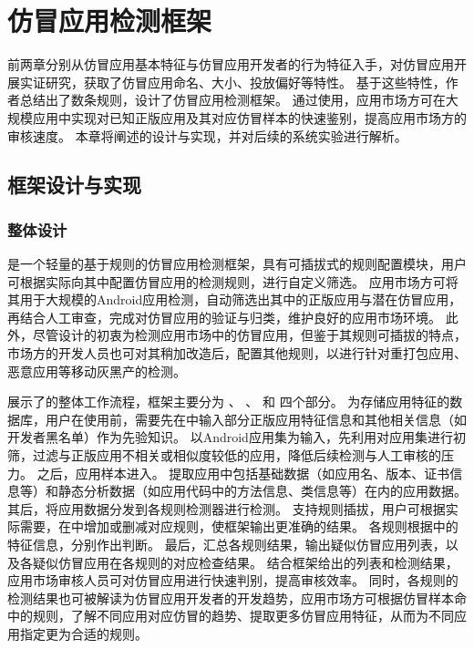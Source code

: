 \chapter{仿冒应用检测框架\mytool}
\label{chp:framework_prototype}

前两章分别从仿冒应用基本特征与仿冒应用开发者的行为特征入手，对仿冒应用开展实证研究，获取了仿冒应用命名、大小、投放偏好等特性。
基于这些特性，作者总结出了数条规则，设计了仿冒应用检测框架\mytool 。
通过使用\mytool ，应用市场方可在大规模应用中实现对已知正版应用及其对应仿冒样本的快速鉴别，提高应用市场方的审核速度。
本章将阐述\mytool 的设计与实现，并对后续的系统实验进行解析。

\section{框架设计与实现}

\subsection{整体设计}
\mytool 是一个轻量的基于规则的仿冒应用检测框架，具有可插拔式的规则配置模块，用户可根据实际向其中配置仿冒应用的检测规则，进行自定义筛选。
应用市场方可将其用于大规模的Android应用检测，自动筛选出其中的正版应用与潜在仿冒应用，再结合人工审查，完成对仿冒应用的验证与归类，维护良好的应用市场环境。
此外，尽管\mytool 设计的初衷为检测应用市场中的仿冒应用，但鉴于其规则可插拔的特点，市场方的开发人员也可对其稍加改造后，配置其他规则，以进行针对重打包应用、恶意应用等移动灰黑产的检测。


展示了\mytool 的整体工作流程，框架主要分为\textbf{\componentA} 、\textbf{\componentB} 、\textbf{\componentC} 和\textbf{\componentD} 四个部分。
\componentD 为存储应用特征的数据库，用户在使用前，需要先在\componentD 中输入部分正版应用特征信息和其他相关信息（如开发者黑名单）作为先验知识。
\mytool 以Android应用集为输入，先利用\componentA 对应用集进行初筛，过滤与正版应用不相关或相似度较低的应用，降低后续检测与人工审核的压力。
之后，应用样本进入\componentB 。
\componentB 提取应用中包括基础数据（如应用名、版本、证书信息等）和静态分析数据（如应用代码中的方法信息、类信息等）在内的应用数据。
其后，\componentC 将应用数据分发到各规则检测器进行检测。
\componentC 支持规则插拔，用户可根据实际需要，在\componentC 中增加或删减对应规则，使框架输出更准确的结果。
各规则根据\componentD 中的特征信息，分别作出判断。
最后，\componentC 汇总各规则结果，输出疑似仿冒应用列表，以及各疑似仿冒应用在各规则的对应检查结果。
结合框架给出的列表和检测结果，应用市场审核人员可对仿冒应用进行快速判别，提高审核效率。
同时，各规则的检测结果也可被解读为仿冒应用开发者的开发趋势，应用市场方可根据仿冒样本命中的规则，了解不同应用对应仿冒的趋势、提取更多仿冒应用特征，从而为不同应用指定更为合适的规则。

